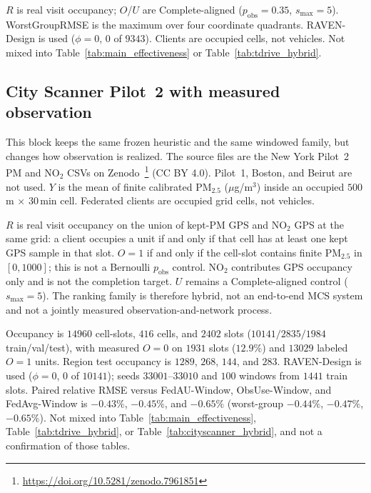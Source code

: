 \begin{table}[t]
\begin{minipage}{\columnwidth}
\raggedright\scriptsize
$R$ is real visit occupancy; $O$/$U$ are Complete-aligned
($p_{\mathrm{obs}}=0.35$, $s_{\max}=5$).
WorstGroupRMSE is the maximum over four coordinate quadrants.
RAVEN-Design is used ($\phi=0$, $0$ of $9343$).
Clients are occupied cells, not vehicles.
Not mixed into Table~\ref{tab:main_effectiveness} or
Table~\ref{tab:tdrive_hybrid}.
\end{minipage}
\end{table}

\subsection{City Scanner Pilot~2 with measured observation}
\label{app:cityscanner_p2_measured_o}

This block keeps the same frozen heuristic and the same windowed family, but
changes how observation is realized.
The source files are the New York Pilot~2 {PM} and {NO}$_2$ CSVs on
Zenodo~\footnote{\url{https://doi.org/10.5281/zenodo.7961851}}
({CC BY} 4.0).  Pilot~1, Boston, and Beirut are not used.
$Y$ is the mean of finite calibrated {PM}$_{2.5}$ ($\mu$g/m$^3$) inside
an occupied $500$\,m $\times$ $30$\,min cell.
Federated clients are occupied grid cells, not vehicles.

$R$ is real visit occupancy on the union of kept-{PM} GPS and {NO}$_2$ GPS
at the same grid: a client occupies a unit if and only if that cell has at
least one kept GPS sample in that slot.
$O=1$ if and only if the cell-slot contains finite {PM}$_{2.5}$ in
$[0,1000]$; this is not a Bernoulli $p_{\mathrm{obs}}$ control.
{NO}$_2$ contributes GPS occupancy only and is not the completion target.
$U$ remains a Complete-aligned control ($s_{\max}=5$).
The ranking family is therefore hybrid, not an end-to-end MCS system and
not a jointly measured observation-and-network process.

Occupancy is $14960$ cell-slots, $416$ cells, and $2402$ slots
($10141/2835/1984$ train/val/test), with measured $O=0$ on $1931$ slots
($12.9\%$) and $13029$ labeled $O=1$ units.
Region test occupancy is $1289$, $268$, $144$, and $283$.
RAVEN-Design is used ($\phi=0$, $0$ of $10141$); seeds $33001$--$33010$ and
$100$ windows from $1441$ train slots.
Paired relative RMSE versus FedAU-Window, ObsUse-Window, and FedAvg-Window is
$-0.43\%$, $-0.45\%$, and $-0.65\%$ (worst-group $-0.44\%$, $-0.47\%$,
$-0.65\%$).
Not mixed into Table~\ref{tab:main_effectiveness},
Table~\ref{tab:tdrive_hybrid}, or Table~\ref{tab:cityscanner_hybrid},
and not a confirmation of those tables.

